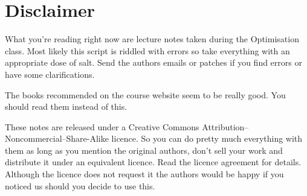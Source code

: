 \section*{Disclaimer}

What you're reading right now are lecture notes taken during the Optimisation class. Most likely this script is riddled with errors so take everything with an appropriate dose of salt. Send the authors emails or patches if you find errors or have some clarifications. 

The books recommended on the course website seem to be really good. You should read them instead of this.

These notes are released under a Creative Commons Attribution--Noncommercial--Share-Alike licence. So you can do pretty much everything with them as long as you mention the original authors, don't sell your work and distribute it under an equivalent licence. Read the licence agreement for details. Although the licence does not request it the authors would be happy if you noticed us should you decide to use this.
\newpage